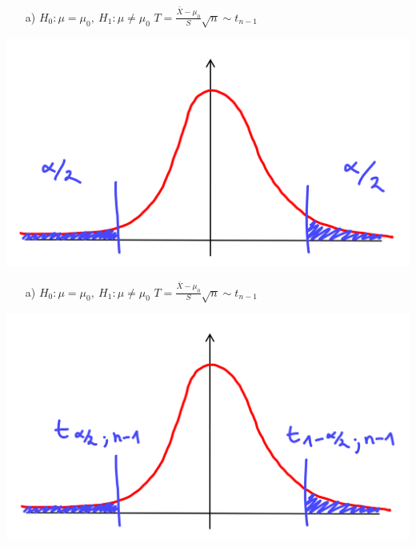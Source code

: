 \documentclass[t,11pt,aspectratio=169]{beamer}
\begin{document}
\begin{frame}
\begin{itemize}
\item[a)] $H_0:\mu=\mu_0,~H_1:\mu\neq\mu_0$ \hfill $T=\frac{\bar{X}-\mu_0}{S}\sqrt{n}\sim t_{n-1}$ \hfill
\end{itemize}
\begin{center}
\includegraphics[scale=0.4]{4.png}
\end{center}
\end{frame}

\begin{frame}
\begin{itemize}
\item[a)] $H_0:\mu=\mu_0,~H_1:\mu\neq\mu_0$ \hfill $T=\frac{\bar{X}-\mu_0}{S}\sqrt{n}\sim t_{n-1}$ \hfill
\end{itemize}
\begin{center}
\includegraphics[scale=0.4]{5.png}
\end{center}
\end{frame}
\end{document}
